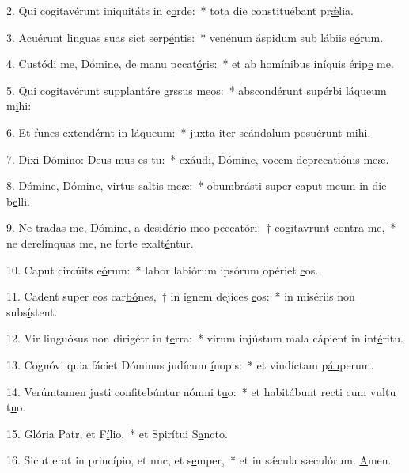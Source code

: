 2. Qui cogitavérunt iniquitáts in c\uline{o}rde:~* tota die constituébant pr\uline{ǽ}lia.\par 
3. Acuérunt linguas suas sict serp\uline{é}ntis:~* venénum áspidum sub lábiis e\uline{ó}rum.\par 
4. Custódi me, Dómine, de manu pccat\uline{ó}ris:~* et ab homínibus iníquis érip\uline{e} me.\par 
5. Qui cogitavérunt supplantáre grssus m\uline{e}os:~* abscondérunt supérbi láqueum m\uline{i}hi:\par 
6. Et funes extendérnt in l\uline{á}queum:~* juxta iter scándalum posuérunt m\uline{i}hi.\par 
7. Dixi Dómino: Deus mus \uline{e}s tu:~* exáudi, Dómine, vocem deprecatiónis m\uline{e}æ.\par 
8. Dómine, Dómine, virtus saltis m\uline{e}æ:~* obumbrásti super caput meum in die b\uline{e}lli.\par 
9. Ne tradas me, Dómine, a desidério meo pecca\uline{tó}ri:~† cogitavrunt c\uline{o}ntra me,~* ne derelínquas me, ne forte exalt\uline{é}ntur.\par 
10. Caput circúits e\uline{ó}rum:~* labor labiórum ipsórum opériet \uline{e}os.\par 
11. Cadent super eos car\uline{bó}nes,~† in ignem dejíces \uline{e}os:~* in misériis non subs\uline{í}stent.\par 
12. Vir linguósus non dirigétr in t\uline{e}rra:~* virum injústum mala cápient in int\uline{é}ritu.\par 
13. Cognóvi quia fáciet Dóminus judícum \uline{í}nopis:~* et vindíctam p\uline{áu}perum.\par 
14. Verúmtamen justi confitebúntur nómni t\uline{u}o:~* et habitábunt recti cum vultu t\uline{u}o.\par 
15. Glória Patr, et F\uline{í}lio,~* et Spirítui S\uline{a}ncto.\par 
16. Sicut erat in princípio, et nnc, et s\uline{e}mper,~* et in sǽcula sæculórum. \uline{A}men.\par 
